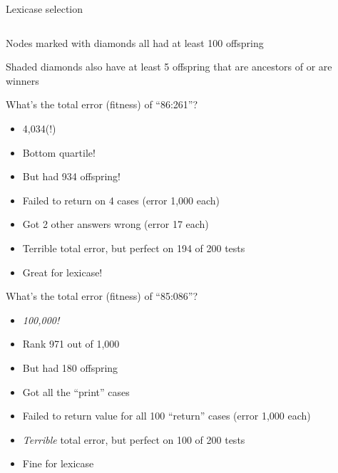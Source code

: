 \documentclass{beamer}
\newcommand{\linespace}{\vskip 0.25cm}
\begin{document}
\begin{frame}{Lexicase selection}
\begin{columns}
\begin{column}{0.45 \linewidth}
\begin{overprint}
			\linespace
			
			Nodes marked with diamonds all had at least 100 offspring
			
			\linespace
			
			Shaded diamonds also have at least 5 offspring that are ancestors of or are winners
			
			What's the total error (fitness) of ``86:261''?
			\begin{itemize}
				\item<4> 4,034(!)
				\item<4> Bottom quartile!
				\item<4> But had 934 offspring! \linespace
				\item<4> Failed to return on 4 cases (error 1,000 each)
				\item<4> Got 2 other answers wrong (error 17 each)
				\item<4> Terrible total error, but perfect on 194 of 200 tests
				\item<4> Great for lexicase!
			\end{itemize}
						
			What's the total error (fitness) of ``85:086''?
			\begin{itemize}
				\item<6> \emph{100,000!}
				\item<6> Rank 971 out of 1,000
				\item<6> But had 180 offspring \linespace
				\item<6> Got all the ``print'' cases
				\item<6> Failed to return value for all 100 ``return'' cases (error 1,000 each)
				\item<6> \emph{Terrible} total error, but perfect on 100 of 200 tests
				\item<6> Fine for lexicase
			\end{itemize}
			
			\end{overprint}
		\end{column}
	\end{columns}
\end{frame}
\end{document}
